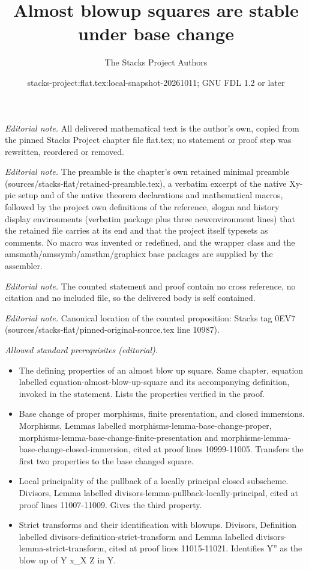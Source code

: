 \documentclass[10pt,a4paper]{amsart}
\title{Almost blowup squares are stable under base change}
\author{The Stacks Project Authors}
\date{stacks-project:flat.tex:local-snapshot-20261011; GNU FDL 1.2 or later}
\theoremstyle{plain}
\theoremstyle{definition}
\theoremstyle{remark}
\numberwithin{equation}{subsection}
\begin{document}
\maketitle
\noindent\textit{Editorial note.} All delivered mathematical text is the author's own, copied from the pinned Stacks Project chapter file flat.tex; no statement or proof step was rewritten, reordered or removed.\par\medskip
\noindent\textit{Editorial note.} The preamble is the chapter's own retained minimal preamble (sources/stacks-flat/retained-preamble.tex), a verbatim excerpt of the native Xy-pic setup and of the native theorem declarations and mathematical macros, followed by the project own definitions of the reference, slogan and history display environments (verbatim package plus three newenvironment lines) that the retained file carries at its end and that the project itself typesets as comments. No macro was invented or redefined, and the wrapper class and the amsmath/amssymb/amsthm/graphicx base packages are supplied by the assembler.\par\medskip
\noindent\textit{Editorial note.} The counted statement and proof contain no cross reference, no citation and no included file, so the delivered body is self contained.\par\medskip
\noindent\textit{Editorial note.} Canonical location of the counted proposition: Stacks tag 0EV7 (sources/stacks-flat/pinned-original-source.tex line 10987).\par\medskip
\noindent\textit{Allowed standard prerequisites (editorial).}\begin{itemize}
\item The defining properties of an almost blow up square. Same chapter, equation labelled equation-almost-blow-up-square and its accompanying definition, invoked in the statement. Lists the properties verified in the proof.
\item Base change of proper morphisms, finite presentation, and closed immersions. Morphisms, Lemmas labelled morphisms-lemma-base-change-proper, morphisms-lemma-base-change-finite-presentation and morphisms-lemma-base-change-closed-immersion, cited at proof lines 10999-11005. Transfers the first two properties to the base changed square.
\item Local principality of the pullback of a locally principal closed subscheme. Divisors, Lemma labelled divisors-lemma-pullback-locally-principal, cited at proof lines 11007-11009. Gives the third property.
\item Strict transforms and their identification with blowups. Divisors, Definition labelled divisors-definition-strict-transform and Lemma labelled divisors-lemma-strict-transform, cited at proof lines 11015-11021. Identifies Y'' as the blow up of Y x\_X Z in Y.
\end{itemize}\medskip
\end{document}
